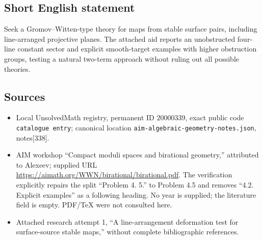 \documentclass[11pt]{article}
\begin{document}
\subsection{Short English statement}
Seek a Gromov--Witten-type theory for maps from stable surface pairs, including line-arranged projective planes. The attached aid reports an unobstructed four-line constant sector and explicit smooth-target examples with higher obstruction groups, testing a natural two-term approach without ruling out all possible theories.
\subsection{Sources}
\begin{itemize}
\item Local UnsolvedMath registry, permanent ID \(20000339\), exact public code \texttt{catalogue entry}; canonical location \texttt{aim-algebraic-geometry-notes.json}, notes[338].
\item AIM workshop ``Compact moduli spaces and birational geometry,'' attributed to Alexeev; supplied URL \url{https://aimath.org/WWN/birational/birational.pdf}. The verification explicitly repairs the split ``Problem 4. 5.'' to Problem 4.5 and removes ``4.2. Explicit examples'' as a following heading. No year is supplied; the literature field is empty. PDF/TeX were not consulted here.
\item Attached research attempt 1, ``A line-arrangement deformation test for surface-source stable maps,'' without complete bibliographic references.
\end{itemize}
\end{document}
